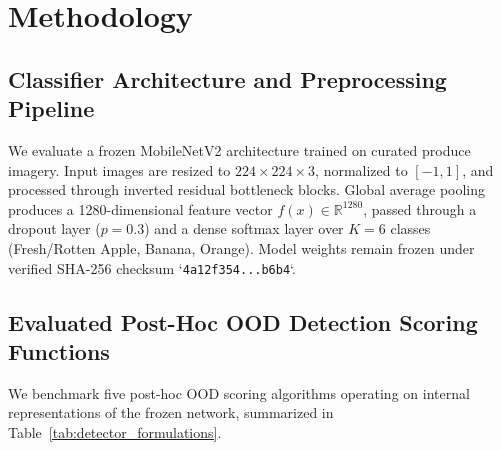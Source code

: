 \section{Methodology}
\label{sec:methodology}

\subsection{Classifier Architecture and Preprocessing Pipeline}
We evaluate a frozen MobileNetV2 architecture \cite{sandler2018mobilenetv2} trained on curated produce imagery. Input images are resized to $224 \times 224 \times 3$, normalized to $[-1, 1]$, and processed through inverted residual bottleneck blocks. Global average pooling produces a 1280-dimensional feature vector $f(x) \in \mathbb{R}^{1280}$, passed through a dropout layer ($p = 0.3$) and a dense softmax layer over $K = 6$ classes (Fresh/Rotten Apple, Banana, Orange). Model weights remain frozen under verified SHA-256 checksum `\texttt{4a12f354...b6b4}`.

\subsection{Evaluated Post-Hoc OOD Detection Scoring Functions}
We benchmark five post-hoc OOD scoring algorithms operating on internal representations of the frozen network, summarized in Table~\ref{tab:detector_formulations}.

